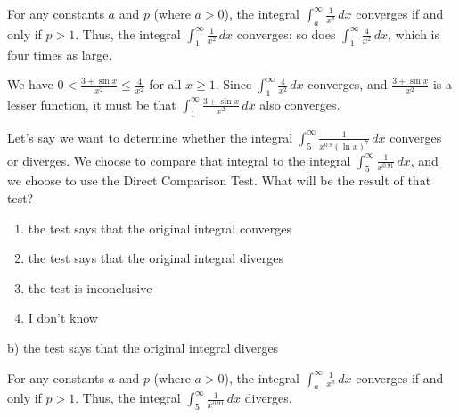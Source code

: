 \documentclass[addpoints,12pt,answers]{exam}
\begin{document}
\begin{questions}
\begin{solution}
    For any constants $a$ and $p$ (where $a>0$), the integral $\displaystyle\int_a^{\infty}\frac{1}{x^p}\,dx$ converges if and only if $p>1$. Thus, the integral $\displaystyle\int_1^\infty\frac{1}{x^2}\,dx$ converges; so does $\displaystyle\int_1^\infty\frac{4}{x^2}\,dx$, which is four times as large.
    
    We have $\displaystyle 0<\frac{3+\sin x}{x^2}\le\frac{4}{x^2}$ for all $x\ge 1$. Since $\displaystyle\int_1^\infty\frac{4}{x^2}\,dx$ converges, and $\displaystyle\frac{3+\sin x}{x^2}$ is a lesser function, it must be that $\displaystyle\int_1^\infty\frac{3+\sin x}{x^2}\,dx$ also converges.
  \end{solution}
  \newpage
  \question
  Let's say we want to determine whether the integral $\displaystyle\int_5^\infty\frac{1}{x^{0.9}(\ln x)^7}\,dx$ converges or diverges. We choose to compare that integral to the integral $\displaystyle\int_5^\infty\frac{1}{x^{0.91}}\,dx$, and we choose to use the Direct Comparison Test. What will be the result of that test?
  \begin{enumerate}[label=\alph*)]
    \item
    the test says that the original integral converges
    \item
    the test says that the original integral diverges
    \item
    the test is inconclusive
    \item
    I don't know
  \end{enumerate}
  \begin{solution}
    b) the test says that the original integral diverges
    
    For any constants $a$ and $p$ (where $a>0$), the integral $\displaystyle\int_a^{\infty}\frac{1}{x^p}\,dx$ converges if and only if $p>1$. Thus, the integral $\displaystyle\int_5^\infty\frac{1}{x^{0.91}}\,dx$ diverges.
    

\end{solution}
\end{questions}
\end{document}

